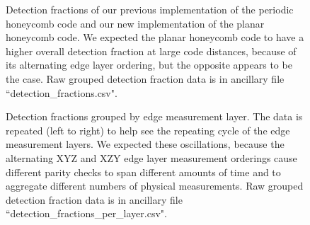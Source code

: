 \documentclass[onecolumn,unpublished,a4paper]{quantumarticle}
\theoremstyle{definition}
\theoremstyle{definition}
\theoremstyle{definition}
\begin{document}
\begin{figure}[h]
    \centering
    \caption{
    Detection fractions of our previous implementation of the periodic honeycomb code and our new implementation of the planar honeycomb code.
    We expected the planar honeycomb code to have a higher overall detection fraction at large code distances, because of its alternating edge layer ordering, but the opposite appears to be the case.
    Raw grouped detection fraction data is in ancillary file ``detection\_fractions.csv".
    }
    \label{fig:detection_fractions}
\end{figure}

\begin{figure}[ht!]
    \centering
    \caption{
    Detection fractions grouped by edge measurement layer.
    The data is repeated (left to right) to help see the repeating cycle of the edge measurement layers.
    We expected these oscillations, because the alternating XYZ and XZY edge layer measurement orderings cause different parity checks to span different amounts of time and to aggregate different numbers of physical measurements.
    Raw grouped detection fraction data is in ancillary file ``detection\_fractions\_per\_layer.csv".
    }
    \label{fig:detection_fractions_over_time}
\end{figure}
\end{document}
